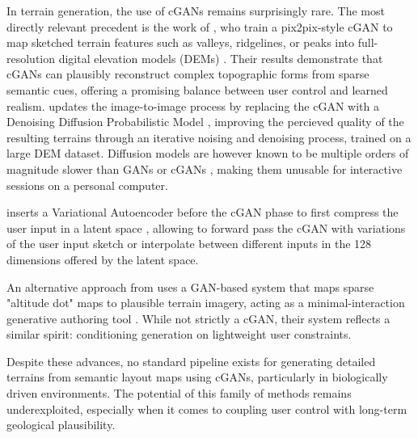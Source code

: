 In terrain generation, the use of cGANs remains surprisingly rare. The most directly relevant precedent is the work of , who train a pix2pix-style cGAN to map sketched terrain features such as valleys, ridgelines, or peaks into full-resolution digital elevation models (DEMs)  \cite{Guerin2017}. Their results demonstrate that cGANs can plausibly reconstruct complex topographic forms from sparse semantic cues, offering a promising balance between user control and learned realism.
 updates the image-to-image process \cite{Lochner2023} by replacing the cGAN with a Denoising Diffusion Probabilistic Model \cite{Ho2020,Nichol2021}, improving the percieved quality of the resulting terrains through an iterative noising and denoising process, trained on a large DEM dataset. Diffusion models are however known to be multiple orders of magnitude slower than GANs or cGANs \cite{Xiao2022,Huang2023}, making them unusable for interactive sessions on a personal computer. 

 inserts a Variational Autoencoder \cite{Kingma2022} before the cGAN phase to first compress the user input in a latent space \cite{Naik2022}, allowing to forward pass the cGAN with variations of the user input sketch or interpolate between different inputs in the 128 dimensions offered by the latent space. 

An alternative approach from  uses a GAN-based system that maps sparse "altitude dot" maps to plausible terrain imagery, acting as a minimal-interaction generative authoring tool \cite{Voulgaris2021}. While not strictly a cGAN, their system reflects a similar spirit: conditioning generation on lightweight user constraints. %

Despite these advances, no standard pipeline exists for generating detailed terrains from semantic layout maps using cGANs, particularly in biologically driven environments. The potential of this family of methods remains underexploited, especially when it comes to coupling user control with long-term geological plausibility.

